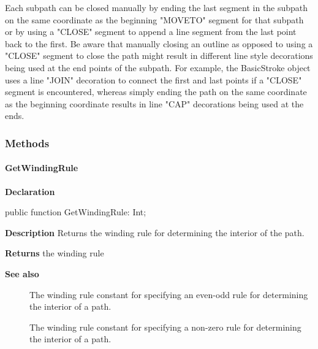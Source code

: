 \documentclass{report}
\newif\ifpdf
\begin{document}
Each subpath can be closed manually by ending the last segment in the subpath on the same coordinate as the beginning "MOVETO" segment for that subpath or by using a "CLOSE" segment to append a line segment from the last point back to the first. Be aware that manually closing an outline as opposed to using a "CLOSE" segment to close the path might result in different line style decorations being used at the end points of the subpath. For example, the BasicStroke object uses a line "JOIN" decoration to connect the first and last points if a "CLOSE" segment is encountered, whereas simply ending the path on the same coordinate as the beginning coordinate results in line "CAP" decorations being used at the ends.\subsubsection*{\large{\textbf{Methods}}\normalsize\hspace{1ex}\hfill}
\paragraph*{GetWindingRule}\hspace*{\fill}

\label{NewPascal.GUI.Geom.PathIterator-GetWindingRule}
\begin{list}{}{
\setlength{\itemindent}{0cm}
\setlength{\listparindent}{0cm}
\setlength{\leftmargin}{\evensidemargin}
\addtolength{\leftmargin}{\tmplength}
\settowidth{\labelsep}{X}
\addtolength{\leftmargin}{\labelsep}
\setlength{\labelwidth}{\tmplength}
}
\item[\textbf{Declaration}\hfill]
\ifpdf
\begin{flushleft}
\fi
\begin{ttfamily}
public function GetWindingRule: Int;\end{ttfamily}

\ifpdf
\end{flushleft}
\fi

\par
\item[\textbf{Description}]
Returns the winding rule for determining the interior of the path.   \par
\item[\textbf{Returns}]the winding rule
\item[\textbf{See also}]
\begin{description}
\item[\begin{ttfamily}WIND{\_}EVEN{\_}ODD\end{ttfamily}(\ref{NewPascal.GUI.Geom-WIND_EVEN_ODD})] 
The winding rule constant for specifying an even{-}odd rule for determining the interior of a path.
\item[\begin{ttfamily}WIND{\_}NON{\_}ZERO\end{ttfamily}(\ref{NewPascal.GUI.Geom-WIND_NON_ZERO})] 
The winding rule constant for specifying a non{-}zero rule for determining the interior of a path.
\end{description}


\end{list}
\end{document}
